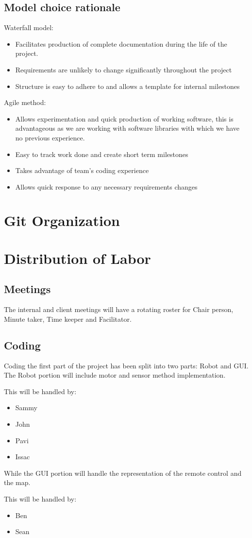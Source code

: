 \documentclass[11pt, letterpaper]{article}
\begin{document}
\subsection{Model choice rationale}
Waterfall model: 
\begin{itemize}
\item Facilitates production of complete documentation during the life of the project.
\item Requirements are unlikely to change significantly throughout the project
\item Structure is easy to adhere to and allows a template for internal milestones
\end{itemize}
Agile method: 
\begin{itemize}
\item Allows experimentation and quick production of working software, 
this is advantageous as we are working with software libraries with which we
 have no previous experience.
\item Easy to track work done and create short term milestones
\item Takes advantage of team's coding experience
\item Allows quick response to any necessary requirements changes
\end{itemize}

\section{Git Organization}

\section{Distribution of Labor}
\subsection{Meetings}
The internal and client meetings will have a rotating roster for Chair person, Minute taker, 
Time keeper and Facilitator.
\subsection{Coding}
Coding the first part of the project has been split into two parts: Robot and GUI.
The Robot portion will include motor and sensor method implementation. 
\par This will be handled by:
\begin{itemize}
\item Sammy
\item John
\item Pavi
\item Issac
\end{itemize}
While the GUI portion will handle the representation of the remote control and the map.\par
This will be handled by:
\begin{itemize}
\item Ben
\item Sean
\end{itemize}
\end{document}
